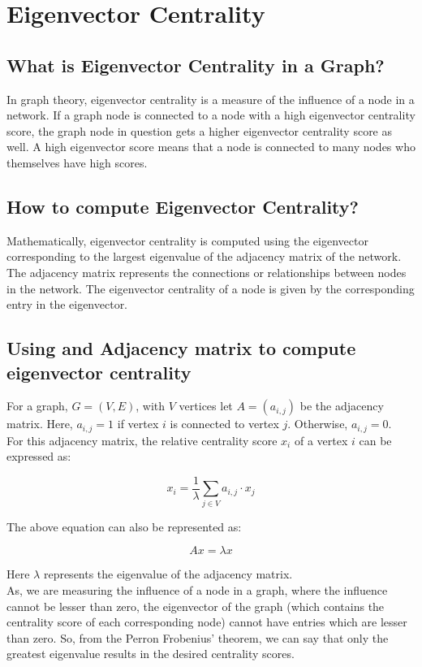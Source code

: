 \documentclass{article}
\begin{document}
\section{Eigenvector Centrality}
    \subsection{What is Eigenvector Centrality in a Graph?}
    In graph theory, eigenvector centrality is a measure of the influence of a node in a network. If a graph node is connected to a node with a high eigenvector centrality score, the graph node in question gets a higher eigenvector centrality score as well. A high eigenvector score means that a node is connected to many nodes who themselves have high scores.

    \subsection{How to compute Eigenvector Centrality?}
    Mathematically, eigenvector centrality is computed using the eigenvector corresponding to the largest eigenvalue of the adjacency matrix of the network. The adjacency matrix represents the connections or relationships between nodes in the network. The eigenvector centrality of a node is given by the corresponding entry in the eigenvector.

    \subsection{Using and Adjacency matrix to compute eigenvector centrality}
    For a graph, $G = (V, E)$, with $V$ vertices let $A = (a_{i, j})$ be the adjacency matrix. Here, $a_{i, j} = 1$ if vertex $i$ is connected to vertex $j$. Otherwise, $a_{i, j} = 0$.\\

    \noindent For this adjacency matrix, the relative centrality score $x_i$ of a vertex $i$ can be expressed as:

    \[x_i = \frac{1}{\lambda} \sum_{j \in V} a_{i, j} \cdot x_j\]

    \noindent The above equation can also be represented as:

    \[Ax = \lambda x\]

    \noindent Here $\lambda$ represents the eigenvalue of the adjacency matrix.\\

    \noindent As, we are measuring the influence of a node in a graph, where the influence cannot be lesser than zero, the eigenvector of the graph (which contains the centrality score of each corresponding node) cannot have entries which are lesser than zero. So, from the Perron Frobenius' theorem, we can say that only the greatest eigenvalue results in the desired centrality scores.
    
\end{document}
